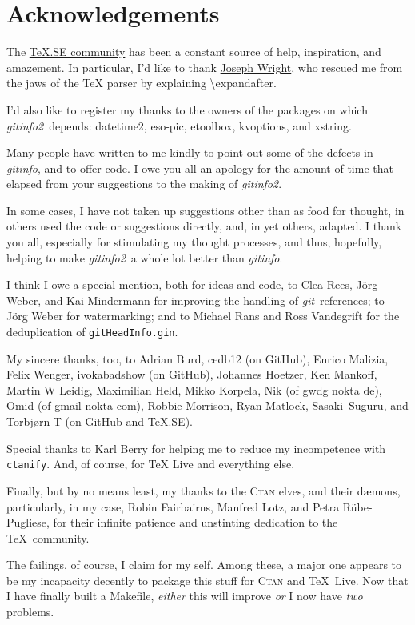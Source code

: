 \documentclass[a4paper,12pt,twoside,openany]{memoir}
\newcommand{\sfit}[1]{\textit{#1}}
\newcommand{\git}{\sfit{git}}
\newcommand{\opname}{\sfit{gitinfo}}
\newcommand{\tpname}{\sfit{gitinfo2}}
\newcommand{\ginname}{gitHeadInfo.gin}
\newcommand{\metaname}{\texttt{\ginname}}
\begin{document}
\clearpage
\section{Acknowledgements}

The \href{http://tex.stackexchange.com}{\TeX.SE community}
has been a constant source of help, inspiration, and amazement.
In particular, I'd like to thank
\href{http://tex.stackexchange.com/users/73/joseph-wright}{Joseph Wright},
who rescued me from the jaws of the TeX parser by explaining
\textbackslash expandafter.

I'd also like to register my thanks to the owners of the packages on which
\tpname\ depends: datetime2, eso-pic, etoolbox, kvoptions, and xstring.

Many people have written to me kindly
to point out some of the defects in \opname, and to offer code.
I owe you all an apology for the amount of time that elapsed
from your suggestions to the making of \tpname.

In some cases, I have not taken up suggestions other than as food for thought,
in others used the code or suggestions directly, and,
in yet others, adapted.
I thank you all, especially for stimulating my thought processes,
and thus, hopefully,
helping to make \tpname\ a whole lot better than \opname.

I think I owe a special mention, both for ideas and code,
to Clea Rees, Jörg Weber, and Kai Mindermann
for improving the handling of \git\ references;
to Jörg Weber for watermarking;
and to Michael Rans and Ross Vandegrift for
the deduplication of \metaname.

My sincere thanks, too, to
Adrian Burd,
cedb12 (on GitHub),
Enrico Malizia,
Felix Wenger,
ivokabadshow (on GitHub),
Johannes Hoetzer,
Ken Mankoff,
Martin W Leidig,
Maximilian Held,
Mikko Korpela,
Nik (of gwdg nokta de),
Omid (of gmail nokta com),
Robbie Morrison,
Ryan Matlock,
Sasaki~Suguru,
and
Torbjørn T (on GitHub and TeX.SE).

Special thanks to Karl Berry for helping me to
reduce my incompetence with \texttt{ctanify}.
And, of course, for \TeX{} Live and everything else.

Finally, but by no means least,
my thanks to the \textsc{Ctan} elves, and their dæmons,
particularly, in my case,
Robin Fairbairns, Manfred Lotz, and Petra Rübe-Pugliese,
for their infinite patience and unstinting
dedication to the \TeX\ community.

The failings, of course, I claim for my self.
Among these, a major one appears to be my incapacity
decently to package this stuff for
\textsc{Ctan} and \TeX{}~Live.
Now that I have finally built a Makefile,
\emph{either} this will improve \emph{or}
I now have \emph{two} problems.
\clearpage
\end{document}
